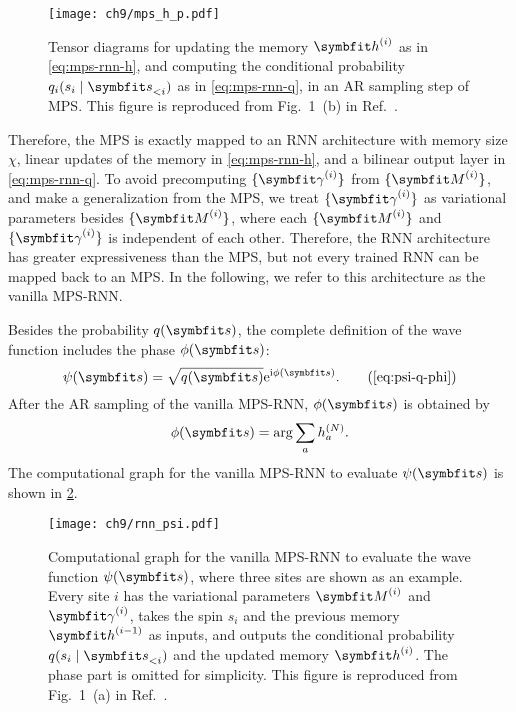 \begin{figure}[htb]
\centering
\texttt{[image: ch9/mps\_h\_p.pdf]}
\caption[Tensor diagrams for an AR sampling step of MPS]{
Tensor diagrams for updating the memory $\vh^{(i)}$ as in \cref{eq:mps-rnn-h}, and computing the conditional probability $q_i(s_i \mid \vs_{< i})$ as in \cref{eq:mps-rnn-q}, in an AR sampling step of MPS.
This figure is reproduced from Fig.~1~(b) in Ref.~\cite{wu2023tensor}.
}
\label{fig:mps-h-p}
\end{figure}

Therefore, the MPS is exactly mapped to an RNN architecture with memory size $\chi$, linear updates of the memory in \cref{eq:mps-rnn-h}, and a bilinear output layer in \cref{eq:mps-rnn-q}. To avoid precomputing $\{\mga^{(i)}\}$ from $\{\mM^{(i)}\}$, and make a generalization from the MPS, we treat $\{\mga^{(i)}\}$ as variational parameters besides $\{\mM^{(i)}\}$, where each $\{\mM^{(i)}\}$ and $\{\mga^{(i)}\}$ is independent of each other. Therefore, the RNN architecture has greater expressiveness than the MPS, but not every trained RNN can be mapped back to an MPS. In the following, we refer to this architecture as the vanilla MPS-RNN.

Besides the probability $q(\vs)$, the complete definition of the wave function includes the phase $\phi(\vs)$:
\begin{equation}
\psi(\vs) = \sqrt{q(\vs)} \rme^{\rmi \phi(\vs)}.
\tag{\ref{eq:psi-q-phi}}
\end{equation}
After the AR sampling of the vanilla MPS-RNN, $\phi(\vs)$ is obtained by
\begin{equation}
\phi(\vs) = \arg \sum_{a} h^{(N)}_a.
\label{eq:mps-rnn-phase}
\end{equation}
The computational graph for the vanilla MPS-RNN to evaluate $\psi(\vs)$ is shown in \cref{fig:rnn-psi}.

\begin{figure}[htb]
\centering
\texttt{[image: ch9/rnn\_psi.pdf]}
\caption[Computational graph for vanilla MPS-RNN]{
Computational graph for the vanilla MPS-RNN to evaluate the wave function $\psi(\vs)$, where three sites are shown as an example.
Every site $i$ has the variational parameters $\mM^{(i)}$ and $\mga^{(i)}$, takes the spin $s_i$ and the previous memory $\vh^{(i - 1)}$ as inputs, and outputs the conditional probability $q(s_i \mid \vs_{< i})$ and the updated memory $\vh^{(i)}$.
The phase part is omitted for simplicity.
This figure is reproduced from Fig.~1~(a) in Ref.~\cite{wu2023tensor}.
}
\label{fig:rnn-psi}
\end{figure}

